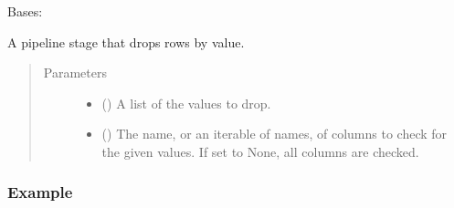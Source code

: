 \documentclass[letterpaper,10pt,english]{sphinxmanual}
\begin{document}
\begin{fulllineitems}
\label{\detokenize{dalio.pipe:dalio.pipe.select.ValDrop}}
Bases: 

A pipeline stage that drops rows by value.
\begin{quote}\begin{description}
\item[{Parameters}] \leavevmode\begin{itemize}
\item {} 
 () \textendash{} A list of the values to drop.

\item {} 
 (\sphinxstyleliteralemphasis{\sphinxupquote{, }}) \textendash{} The name, or an iterable of names, of columns to check for the given
values. If set to None, all columns are checked.

\end{itemize}

\end{description}\end{quote}
\subsubsection*{Example}


\end{fulllineitems}
\end{document}
